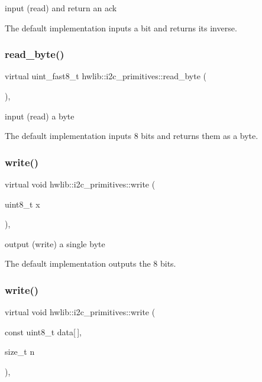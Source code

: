 input (read) and return an ack

The default implementation inputs a bit and returns its inverse. \mbox{\label{classhwlib_1_1i2c__primitives_a21c9843d3a7801781e576013a1e154f9}} 
\subsubsection{\texorpdfstring{read\_byte()}{read\_byte()}}
{\footnotesize\ttfamily virtual uint\+\_\+fast8\+\_\+t hwlib\+::i2c\+\_\+primitives\+::read\+\_\+byte (\begin{DoxyParamCaption}{ }\end{DoxyParamCaption})\hspace{0.3cm}{\ttfamily [inline]}, {\ttfamily [virtual]}}

input (read) a byte

The default implementation inputs 8 bits and returns them as a byte. \mbox{\label{classhwlib_1_1i2c__primitives_aa5227ae39d6dd5957cf47b0b761b475b}} 
\subsubsection{\texorpdfstring{write()}{write()}\hspace{0.1cm}{\footnotesize\ttfamily [1/2]}}
{\footnotesize\ttfamily virtual void hwlib\+::i2c\+\_\+primitives\+::write (\begin{DoxyParamCaption}\item[{uint8\+\_\+t}]{x }\end{DoxyParamCaption})\hspace{0.3cm}{\ttfamily [inline]}, {\ttfamily [virtual]}}

output (write) a single byte

The default implementation outputs the 8 bits. \mbox{\label{classhwlib_1_1i2c__primitives_ac1b43fe4971b5df06a0b45f2154e7864}} 
\subsubsection{\texorpdfstring{write()}{write()}\hspace{0.1cm}{\footnotesize\ttfamily [2/2]}}
{\footnotesize\ttfamily virtual void hwlib\+::i2c\+\_\+primitives\+::write (\begin{DoxyParamCaption}\item[{const uint8\+\_\+t}]{data\mbox{[}$\,$\mbox{]},  }\item[{size\+\_\+t}]{n }\end{DoxyParamCaption})\hspace{0.3cm}{\ttfamily [inline]}, {\ttfamily [virtual]}}

